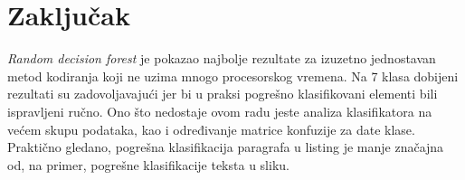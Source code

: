 \documentclass[]{amsart}
\begin{document}
\section{Zaključak}
\label{sec:orge359279}

\textit{Random decision forest} je pokazao najbolje rezultate za izuzetno jednostavan metod kodiranja koji ne uzima mnogo procesorskog vremena. Na 7 klasa dobijeni
rezultati su zadovoljavajući jer bi u praksi pogrešno klasifikovani elementi bili ispravljeni ručno. Ono što nedostaje ovom radu jeste
analiza klasifikatora na većem skupu podataka, kao i određivanje matrice konfuzije za date klase. Praktično gledano, pogrešna klasifikacija paragrafa u listing je manje
značajna od, na primer, pogrešne klasifikacije teksta u sliku.





\end{document}
